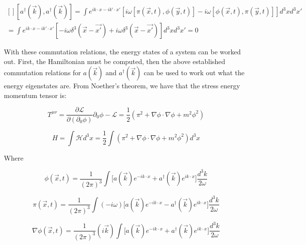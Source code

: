 \documentclass{article}
\begin{document}
    \begin{equation}
        \begin{aligned}[]
            [a^{\dag}(\vec{k}), a^{\dag}(\vec{k})] = \int e^{i k \cdot x - i k' \cdot x'} [i \omega [\pi(\vec{x}, t), \phi(\vec{y}, t)] - i \omega [\phi(\vec{x}, t), \pi(\vec{y}, t)]] d^{3} x d^{3} x' \\
            = \int e^{i k \cdot x - i k' \cdot x'} [- i \omega \delta^{3} (\vec{x} - \vec{x'}) + i \omega \delta^{3} (\vec{x} - \vec{x'})] d^{3} x d^{3} x' = 0
        \end{aligned}
    \end{equation}

    With these commutation relations, the energy states of a system can be worked out. First, the Hamiltonian must be computed, then the above established commutation relations for $a(\vec{k})$ and $a^{\dag}(\vec{k})$ can 
    be used to work out what the energy eigenstates are. From Noether's theorem, we have that the stress energy momentum tensor is:
    
    \begin{equation}
        T^{\mu \nu} = \frac{\partial \mathcal{L}}{\partial (\partial_{0} \phi)} \partial_{0} \phi - \mathcal{L} = \frac{1}{2} (\pi^{2} + \nabla \phi \cdot \nabla \phi + m^{2} \phi^{2})
    \end{equation}

    \begin{equation}
        H = \int \mathcal{H} d^{3} x = \frac{1}{2} \int (\pi^{2} + \nabla \phi \cdot \nabla \phi + m^{2} \phi^{2}) d^{3} x
    \end{equation}
    
    Where

    \begin{equation}
        \phi (\vec{x}, t) = \frac{1}{(2 \pi)^3} \int \Big[ a(\vec{k}) e^{-i k \cdot x} + a^{\dag}(\vec{k}) e^{i k \cdot x} \Big] \frac{d^3k}{2 \omega}
    \end{equation}

    \begin{equation}
        \pi (\vec{x}, t) = \frac{1}{(2 \pi)^3} \int (- i \omega) \Big[ a(\vec{k}) e^{-i k \cdot x} - a^{\dag}(\vec{k}) e^{i k \cdot x} \Big] \frac{d^3k}{2 \omega}
    \end{equation}

    \begin{equation}
        \nabla \phi (\vec{x}, t) = \frac{1}{(2 \pi)^3} (i \vec{k}) \int \Big[ a(\vec{k}) e^{-i k \cdot x} + a^{\dag}(\vec{k}) e^{i k \cdot x} \Big] \frac{d^3k}{2 \omega}
    \end{equation}
\end{document}
